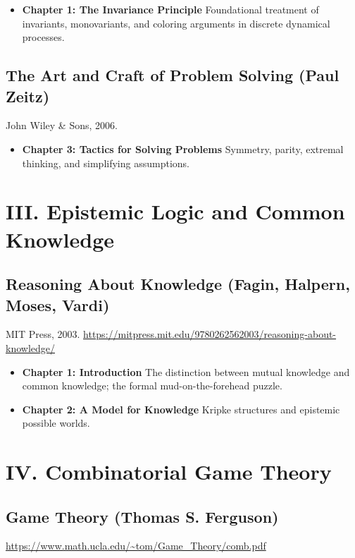 \documentclass[11pt]{article}
\begin{document}
\begin{itemize}
    \item \textbf{Chapter 1: The Invariance Principle} Foundational treatment of invariants, monovariants, and coloring arguments in discrete dynamical processes.
\end{itemize}

\subsection*{The Art and Craft of Problem Solving (Paul Zeitz)}
John Wiley \& Sons, 2006.

\begin{itemize}
    \item \textbf{Chapter 3: Tactics for Solving Problems} Symmetry, parity, extremal thinking, and simplifying assumptions.
\end{itemize}

\section*{III. Epistemic Logic and Common Knowledge}

\subsection*{Reasoning About Knowledge (Fagin, Halpern, Moses, Vardi)}
MIT Press, 2003. \url{https://mitpress.mit.edu/9780262562003/reasoning-about-knowledge/}

\begin{itemize}
    \item \textbf{Chapter 1: Introduction} The distinction between mutual knowledge and common knowledge; the formal mud-on-the-forehead puzzle.
    \item \textbf{Chapter 2: A Model for Knowledge} Kripke structures and epistemic possible worlds.
\end{itemize}

\section*{IV. Combinatorial Game Theory}

\subsection*{Game Theory (Thomas S. Ferguson)}
\url{https://www.math.ucla.edu/~tom/Game_Theory/comb.pdf}
\end{document}
